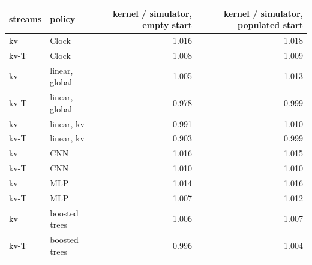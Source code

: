\begin{tabular}{llrr}
\toprule
streams & policy & kernel / simulator, empty start & kernel / simulator, populated start \\
\midrule
kv & Clock & 1.016 & 1.018 \\
kv-T & Clock & 1.008 & 1.009 \\
kv & linear, global & 1.005 & 1.013 \\
kv-T & linear, global & 0.978 & 0.999 \\
kv & linear, kv & 0.991 & 1.010 \\
kv-T & linear, kv & 0.903 & 0.999 \\
kv & CNN & 1.016 & 1.015 \\
kv-T & CNN & 1.010 & 1.010 \\
kv & MLP & 1.014 & 1.016 \\
kv-T & MLP & 1.007 & 1.012 \\
kv & boosted trees & 1.006 & 1.007 \\
kv-T & boosted trees & 0.996 & 1.004 \\
\bottomrule
\end{tabular}
